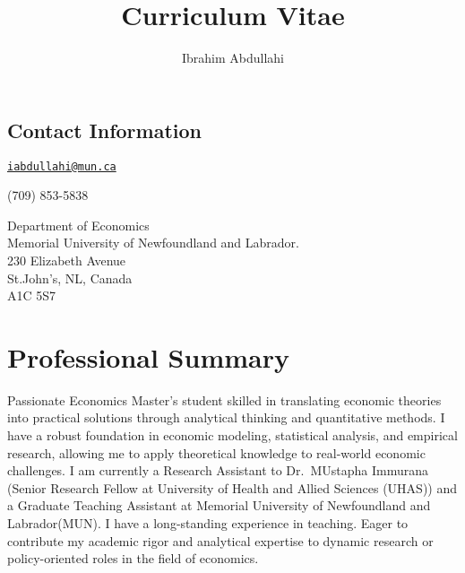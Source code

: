 \documentclass[
  letterpaper,
  DIV=11,
  numbers=noendperiod]{scrartcl}
\title{Curriculum Vitae}
\author{Ibrahim Abdullahi}
\date{}
\begin{document}
\maketitle
\ifdefined\Shaded\renewenvironment{Shaded}{\begin{tcolorbox}[enhanced, borderline west={3pt}{0pt}{shadecolor}, boxrule=0pt, sharp corners, frame hidden, interior hidden, breakable]}{\end{tcolorbox}}\fi

\hypertarget{contact-information}{%
\subsection{Contact Information}\label{contact-information}}

\href{mailto:iabdullahi@mun.ca}{\nolinkurl{iabdullahi@mun.ca}}

 (709) 853-5838

Department of Economics\\
\hspace*{0.333em}\hspace*{0.333em}\hspace*{0.333em}\hspace*{0.333em}
Memorial University of Newfoundland and Labrador.\\
\hspace*{0.333em}\hspace*{0.333em}\hspace*{0.333em}\hspace*{0.333em} 230
Elizabeth Avenue\\
\hspace*{0.333em}\hspace*{0.333em}\hspace*{0.333em}\hspace*{0.333em}
St.John's, NL, Canada\\
\hspace*{0.333em}\hspace*{0.333em}\hspace*{0.333em}\hspace*{0.333em} A1C
5S7

\hypertarget{professional-summary}{%
\section{Professional Summary}\label{professional-summary}}

Passionate Economics Master's student skilled in translating economic
theories into practical solutions through analytical thinking and
quantitative methods. I have a robust foundation in economic modeling,
statistical analysis, and empirical research, allowing me to apply
theoretical knowledge to real-world economic challenges. I am currently
a Research Assistant to Dr.~MUstapha Immurana (Senior Research Fellow at
University of Health and Allied Sciences (UHAS)) and a Graduate Teaching
Assistant at Memorial University of Newfoundland and Labrador(MUN). I
have a long-standing experience in teaching. Eager to contribute my
academic rigor and analytical expertise to dynamic research or
policy-oriented roles in the field of economics.
\end{document}
